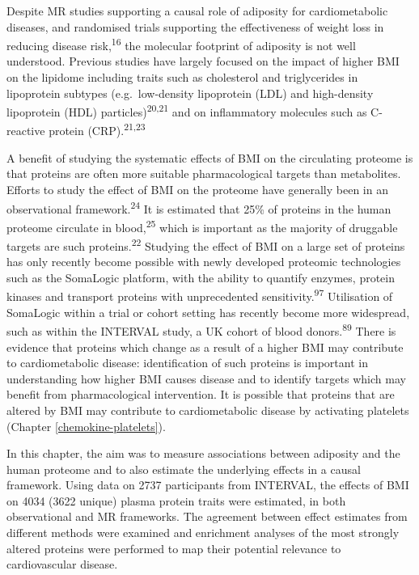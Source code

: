 \documentclass[11pt,twoside]{bristolthesis}
\begin{document}
Despite MR studies supporting a causal role of adiposity for cardiometabolic diseases, and randomised trials supporting the effectiveness of weight loss in reducing disease risk,\textsuperscript{16} the molecular footprint of adiposity is not well understood. Previous studies have largely focused on the impact of higher BMI on the lipidome including traits such as cholesterol and triglycerides in lipoprotein subtypes (e.g.~low-density lipoprotein (LDL) and high-density lipoprotein (HDL) particles)\textsuperscript{20,21} and on inflammatory molecules such as C-reactive protein (CRP).\textsuperscript{21,23}

A benefit of studying the systematic effects of BMI on the circulating proteome is that proteins are often more suitable pharmacological targets than metabolites. Efforts to study the effect of BMI on the proteome have generally been in an observational framework.\textsuperscript{24} It is estimated that 25\% of proteins in the human proteome circulate in blood,\textsuperscript{25} which is important as the majority of druggable targets are such proteins.\textsuperscript{22} Studying the effect of BMI on a large set of proteins has only recently become possible with newly developed proteomic technologies such as the SomaLogic platform, with the ability to quantify enzymes, protein kinases and transport proteins with unprecedented sensitivity.\textsuperscript{97} Utilisation of SomaLogic within a trial or cohort setting has recently become more widespread, such as within the INTERVAL study, a UK cohort of blood donors.\textsuperscript{89} There is evidence that proteins which change as a result of a higher BMI may contribute to cardiometabolic disease: identification of such proteins is important in understanding how higher BMI causes disease and to identify targets which may benefit from pharmacological intervention. It is possible that proteins that are altered by BMI may contribute to cardiometabolic disease by activating platelets (Chapter \ref{chemokine-platelets}).

In this chapter, the aim was to measure associations between adiposity and the human proteome and to also estimate the underlying effects in a causal framework. Using data on 2737 participants from INTERVAL, the effects of BMI on 4034 (3622 unique) plasma protein traits were estimated, in both observational and MR frameworks. The agreement between effect estimates from different methods were examined and enrichment analyses of the most strongly altered proteins were performed to map their potential relevance to cardiovascular disease.
\end{document}
